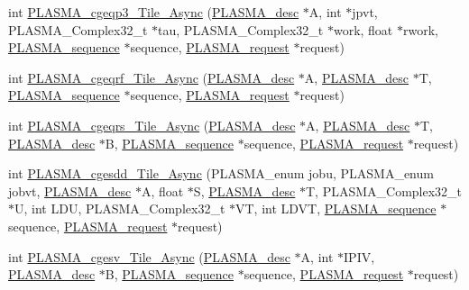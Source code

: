 \begin{DoxyCompactItemize}
int \hyperlink{group__PLASMA__Complex32__t__Tile__Async_ga940da453f7fc322f5c3969d24b101599_ga940da453f7fc322f5c3969d24b101599}{P\+L\+A\+S\+M\+A\+\_\+cgeqp3\+\_\+\+Tile\+\_\+\+Async} (\hyperlink{structplasma__desc__t}{P\+L\+A\+S\+M\+A\+\_\+desc} $\ast$A, int $\ast$jpvt, P\+L\+A\+S\+M\+A\+\_\+\+Complex32\+\_\+t $\ast$tau, P\+L\+A\+S\+M\+A\+\_\+\+Complex32\+\_\+t $\ast$work, float $\ast$rwork, \hyperlink{structplasma__sequence__t}{P\+L\+A\+S\+M\+A\+\_\+sequence} $\ast$sequence, \hyperlink{structplasma__request__t}{P\+L\+A\+S\+M\+A\+\_\+request} $\ast$request)
\item 
int \hyperlink{group__PLASMA__Complex32__t__Tile__Async_ga561953a55a51d48f1a011a17770a1d08_ga561953a55a51d48f1a011a17770a1d08}{P\+L\+A\+S\+M\+A\+\_\+cgeqrf\+\_\+\+Tile\+\_\+\+Async} (\hyperlink{structplasma__desc__t}{P\+L\+A\+S\+M\+A\+\_\+desc} $\ast$A, \hyperlink{structplasma__desc__t}{P\+L\+A\+S\+M\+A\+\_\+desc} $\ast$T, \hyperlink{structplasma__sequence__t}{P\+L\+A\+S\+M\+A\+\_\+sequence} $\ast$sequence, \hyperlink{structplasma__request__t}{P\+L\+A\+S\+M\+A\+\_\+request} $\ast$request)
\item 
int \hyperlink{group__PLASMA__Complex32__t__Tile__Async_gae06221bd74487f9617c819c4626f27ac_gae06221bd74487f9617c819c4626f27ac}{P\+L\+A\+S\+M\+A\+\_\+cgeqrs\+\_\+\+Tile\+\_\+\+Async} (\hyperlink{structplasma__desc__t}{P\+L\+A\+S\+M\+A\+\_\+desc} $\ast$A, \hyperlink{structplasma__desc__t}{P\+L\+A\+S\+M\+A\+\_\+desc} $\ast$T, \hyperlink{structplasma__desc__t}{P\+L\+A\+S\+M\+A\+\_\+desc} $\ast$B, \hyperlink{structplasma__sequence__t}{P\+L\+A\+S\+M\+A\+\_\+sequence} $\ast$sequence, \hyperlink{structplasma__request__t}{P\+L\+A\+S\+M\+A\+\_\+request} $\ast$request)
\item 
int \hyperlink{group__PLASMA__Complex32__t__Tile__Async_ga6b8c978253c14d0173ff6e11ff88bda7_ga6b8c978253c14d0173ff6e11ff88bda7}{P\+L\+A\+S\+M\+A\+\_\+cgesdd\+\_\+\+Tile\+\_\+\+Async} (P\+L\+A\+S\+M\+A\+\_\+enum jobu, P\+L\+A\+S\+M\+A\+\_\+enum jobvt, \hyperlink{structplasma__desc__t}{P\+L\+A\+S\+M\+A\+\_\+desc} $\ast$A, float $\ast$S, \hyperlink{structplasma__desc__t}{P\+L\+A\+S\+M\+A\+\_\+desc} $\ast$T, P\+L\+A\+S\+M\+A\+\_\+\+Complex32\+\_\+t $\ast$U, int L\+D\+U, P\+L\+A\+S\+M\+A\+\_\+\+Complex32\+\_\+t $\ast$V\+T, int L\+D\+V\+T, \hyperlink{structplasma__sequence__t}{P\+L\+A\+S\+M\+A\+\_\+sequence} $\ast$sequence, \hyperlink{structplasma__request__t}{P\+L\+A\+S\+M\+A\+\_\+request} $\ast$request)
\item 
int \hyperlink{group__PLASMA__Complex32__t__Tile__Async_ga0fd2ae3ef40548348c9862fa1d9a5236_ga0fd2ae3ef40548348c9862fa1d9a5236}{P\+L\+A\+S\+M\+A\+\_\+cgesv\+\_\+\+Tile\+\_\+\+Async} (\hyperlink{structplasma__desc__t}{P\+L\+A\+S\+M\+A\+\_\+desc} $\ast$A, int $\ast$I\+P\+I\+V, \hyperlink{structplasma__desc__t}{P\+L\+A\+S\+M\+A\+\_\+desc} $\ast$B, \hyperlink{structplasma__sequence__t}{P\+L\+A\+S\+M\+A\+\_\+sequence} $\ast$sequence, \hyperlink{structplasma__request__t}{P\+L\+A\+S\+M\+A\+\_\+request} $\ast$request)

\end{DoxyCompactItemize}
